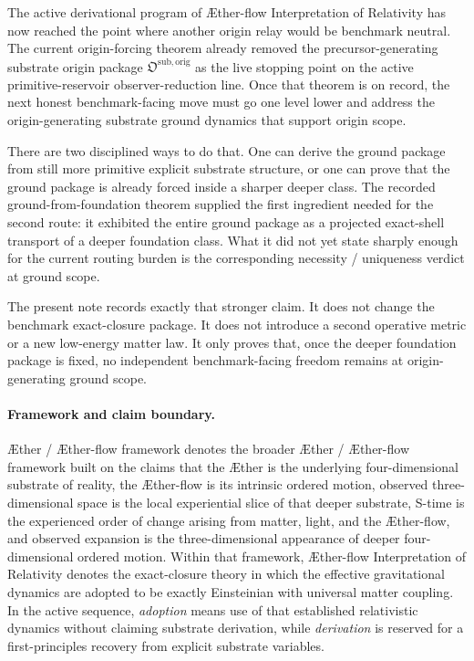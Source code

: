 \documentclass[11pt]{article}
\newcommand{\Aether}{\AE{}ther}
\newcommand{\Aflow}{\AE{}ther-flow}
\newcommand{\TheoryName}{\Aflow{} Interpretation of Relativity}
\newcommand{\TheoryProgram}{\Aether{} / \Aflow{} framework}
\newcommand{\OriginPackage}{\mathfrak O^{\mathrm{sub,orig}}}
\begin{document}
The active derivational program of \TheoryName{} has now reached the point where another origin relay would be benchmark neutral. The current origin-forcing theorem already removed the precursor-generating substrate origin package \(\OriginPackage\) as the live stopping point on the active primitive-reservoir observer-reduction line. Once that theorem is on record, the next honest benchmark-facing move must go one level lower and address the origin-generating substrate ground dynamics that support origin scope.

There are two disciplined ways to do that. One can derive the ground package from still more primitive explicit substrate structure, or one can prove that the ground package is already forced inside a sharper deeper class. The recorded ground-from-foundation theorem supplied the first ingredient needed for the second route: it exhibited the entire ground package as a projected exact-shell transport of a deeper foundation class. What it did not yet state sharply enough for the current routing burden is the corresponding necessity / uniqueness verdict at ground scope.

The present note records exactly that stronger claim. It does not change the benchmark exact-closure package. It does not introduce a second operative metric or a new low-energy matter law. It only proves that, once the deeper foundation package is fixed, no independent benchmark-facing freedom remains at origin-generating ground scope.

\paragraph{Framework and claim boundary.}
\TheoryProgram{} denotes the broader \Aether{} / \Aflow{} framework built on the claims that the \Aether{} is the underlying four-dimensional substrate of reality, the \Aflow{} is its intrinsic ordered motion, observed three-dimensional space is the local experiential slice of that deeper substrate, S-time is the experienced order of change arising from matter, light, and the \Aflow{}, and observed expansion is the three-dimensional appearance of deeper four-dimensional ordered motion. Within that framework, \TheoryName{} denotes the exact-closure theory in which the effective gravitational dynamics are adopted to be exactly Einsteinian with universal matter coupling. In the active sequence, \emph{adoption} means use of that established relativistic dynamics without claiming substrate derivation, while \emph{derivation} is reserved for a first-principles recovery from explicit substrate variables.
\end{document}
